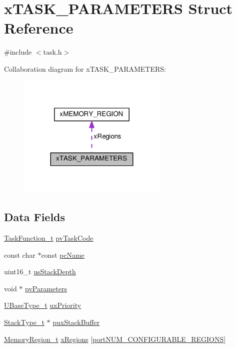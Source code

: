 \hypertarget{structxTASK__PARAMETERS}{}\section{x\+T\+A\+S\+K\+\_\+\+P\+A\+R\+A\+M\+E\+T\+E\+RS Struct Reference}
\label{structxTASK__PARAMETERS}


{\ttfamily \#include $<$task.\+h$>$}



Collaboration diagram for x\+T\+A\+S\+K\+\_\+\+P\+A\+R\+A\+M\+E\+T\+E\+RS\+:\nopagebreak
\begin{figure}[H]
\begin{center}
\leavevmode
\includegraphics[width=203pt]{d5/d5e/structxTASK__PARAMETERS__coll__graph}
\end{center}
\end{figure}
\subsection*{Data Fields}
\begin{DoxyCompactItemize}
\item 
\hyperlink{projdefs_8h_a9b32502ff92c255c686dacde53c1cba0}{Task\+Function\+\_\+t} \hyperlink{structxTASK__PARAMETERS_a7527993402054565cda38251c8922880}{pv\+Task\+Code}
\item 
const char $\ast$const \hyperlink{structxTASK__PARAMETERS_a7b3e5583acf9de8bacac572a42246459}{pc\+Name}
\item 
uint16\+\_\+t \hyperlink{structxTASK__PARAMETERS_aa07bfb2214d78ba7a30592fa7b75af18}{us\+Stack\+Depth}
\item 
void $\ast$ \hyperlink{structxTASK__PARAMETERS_accbb9f4de75b5b5be750198b52390c7f}{pv\+Parameters}
\item 
\hyperlink{portmacro_8h_a646f89d4298e4f5afd522202b11cb2e6}{U\+Base\+Type\+\_\+t} \hyperlink{structxTASK__PARAMETERS_aa1aff14035db645e2bdcc85b3cdc9bab}{ux\+Priority}
\item 
\hyperlink{portmacro_8h_a84e9a8ba132feed0b2401c1f4e2ac63c}{Stack\+Type\+\_\+t} $\ast$ \hyperlink{structxTASK__PARAMETERS_a946c525d3765369780538f9bc3f3586d}{pux\+Stack\+Buffer}
\item 
\hyperlink{task_8h_af609504de4d78ff6f71477ae47c66e51}{Memory\+Region\+\_\+t} \hyperlink{structxTASK__PARAMETERS_ae8b97c6b7a344bf09b066b0844844d66}{x\+Regions} \mbox{[}\hyperlink{portable_8h_aca7e1a8a568a38b74cc9db10c8efebda}{port\+N\+U\+M\+\_\+\+C\+O\+N\+F\+I\+G\+U\+R\+A\+B\+L\+E\+\_\+\+R\+E\+G\+I\+O\+NS}\mbox{]}
\end{DoxyCompactItemize}


